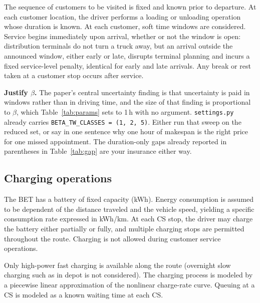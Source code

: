 The sequence of customers to be visited is fixed and known prior to departure. At each customer location, the driver performs a loading or unloading operation whose duration is known.
At each customer, soft time windows are considered. Service begins immediately upon arrival, whether or not the window is open: distribution terminals do not turn a truck away, but an arrival outside the announced window, either early or late, disrupts terminal planning and incurs a fixed service-level penalty, identical for early and late arrivals. Any break or rest taken at a customer stop occurs after service. 

\begin{atodo}
\textbf{Justify $\beta$.} The paper's central uncertainty finding is that
uncertainty is paid in windows rather than in driving time, and the size of that
finding is proportional to $\beta$, which Table~\ref{tab:params} sets to 1\,h with
no argument. \texttt{settings.py} already carries
\texttt{BETA\_TW\_CLASSES = (1, 2, 5)}. Either run that sweep on the reduced set,
or say in one sentence why one hour of makespan is the right price for one missed
appointment. The duration-only gaps already reported in parentheses in
Table~\ref{tab:gap} are your insurance either way.
\end{atodo}

\subsection{Charging operations}
The BET has a battery of fixed capacity (kWh). Energy consumption is assumed to be dependent of the distance traveled and the vehicle speed, yielding a specific consumption rate expressed in kWh/km. At each CS stop, the driver may charge the battery either partially or fully, and multiple charging stops are permitted throughout the route. Charging is not allowed during customer service operations.

Only high-power fast charging is available along the route (overnight slow charging such as in depot is not considered). The charging process is modeled by a piecewise linear approximation of the nonlinear charge-rate curve. Queuing at a CS is modeled as a known waiting time at each CS.

